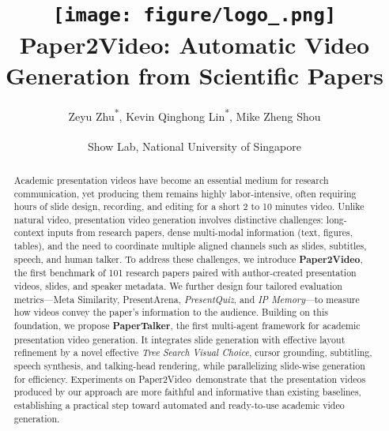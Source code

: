 \documentclass{article} %
\title{\texttt{[image: figure/logo\_.png]} Paper2Video:
Automatic Video Generation from Scientific Papers}
\author{
  Zeyu Zhu\textsuperscript{*}, 
  Kevin Qinghong Lin\textsuperscript{*}, 
  Mike Zheng Shou\textsuperscript{\Letter}\\
  \\
  Show Lab, National University of Singapore \\
}
\newcommand{\bench}{Paper2Video}
\newcommand{\agent}{PaperTalker}
\begin{document}
\maketitle
\let\thefootnote\relax
{}
\let\thefootnote\relax
{}
\vspace{-2\baselineskip} 
\begin{abstract}
\vspace{-1\baselineskip} 
Academic presentation videos have become an essential medium for research communication, yet producing them remains highly labor-intensive, often requiring hours of slide design, recording, and editing for a short 2 to 10 minutes video. 
Unlike natural video, presentation video generation involves distinctive challenges: long-context inputs from research papers, dense multi-modal information (text, figures, tables), and the need to coordinate multiple aligned channels such as slides, subtitles, speech, and human talker. 
To address these challenges, we introduce \textbf{\bench}, the first benchmark of 101 research papers paired with author-created presentation videos, slides, and speaker metadata. We further design four tailored evaluation metrics—Meta Similarity, PresentArena, \textit{PresentQuiz}, and \textit{IP Memory}—to measure how videos convey the paper's information to the audience. Building on this foundation, we propose \textbf{\agent}, the first multi-agent framework for academic presentation video generation. It integrates slide generation with effective layout refinement by a novel effective \textit{Tree Search Visual Choice}, cursor grounding, subtitling, speech synthesis, and talking-head rendering, while parallelizing slide-wise generation for efficiency. Experiments on \bench~demonstrate that the presentation videos produced by our approach are more faithful and informative than existing baselines, establishing a practical step toward automated and ready-to-use academic video generation.
\end{abstract}









\newpage

 

\newpage

\end{document}
